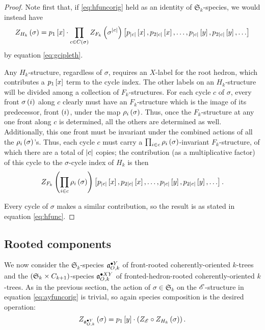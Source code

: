 \documentclass[sectionflow,singlespace,twoside,boldmathhdr]{brandiss} %
\numberwithin{section}{chapter}
\numberwithin{figure}{chapter}
\begin{document}
\begin{proof}
  Note first that, if \eqref{eq:hfuncorig} held as an identity of $\mathfrak{S}_{k}$-species, we would instead have
  \begin{equation*}
    Z_{H_{k}} \pbrac{\sigma} = p_{1} \sbrac{x} \cdot \prod_{c \in C \pbrac{\sigma}} Z_{F_{k}} \pbrac{\sigma^{\abs{c}}} \sbrac{p_{\abs{c}} \sbrac{x}, p_{2 \abs{c}} \sbrac{x}, \dots, p_{\abs{c}} \sbrac{y}, p_{2 \abs{c}} \sbrac{y}, \dots}
  \end{equation*}
  by equation \eqref{eq:gcipleth}.

  Any $H_{k}$-structure, regardless of $\sigma$, requires an $X$-label for the root hedron, which contributes a $p_{1} \sbrac{x}$ term to the cycle index.
  The other labels on an $H_{k}$-structure will be divided among a collection of $F_{k}$-structures.
  For each cycle $c$ of $\sigma$, every front $\sigma \pbrac{i}$ along $c$ clearly must have an $F_{k}$-structure which is the image of its predecessor, front $\pbrac{i}$, under the map $\rho_{i} \pbrac{\sigma}$.
  Thus, once the $F_{k}$-structure at any one front along $c$ is determined, all the others are determined as well.
  Additionally, this one front must be invariant under the combined actions of all the $\rho_{i} \pbrac{\sigma}$'s.
  Thus, each cycle $c$ must carry a $\prod_{i \in c} \rho_{i} \pbrac{\sigma}$-invariant $F_{k}$-structure, of which there are a total of $\abs{c}$ copies; the contribution (as a multiplicative factor) of this cycle to the $\sigma$-cycle index of $H_{k}$ is then
  \begin{equation*}
    Z_{F_{k}} \pbrac{\prod_{i \in c} \rho_{i} \pbrac{\sigma}} \sbrac{p_{\abs{c}} \sbrac{x}, p_{2 \abs{c}} \sbrac{x}, \dots, p_{\abs{c}} \sbrac{y}, p_{2 \abs{c}} \sbrac{y}, \dots}.
  \end{equation*}

  Every cycle of $\sigma$ makes a similar contribution, so the result is as stated in equation \eqref{eq:hfunc}.
\end{proof}

\subsection{Rooted components}\label{ss:ktcycindroot}
We now consider the $\mathfrak{S}_{k}$-species $\pointed[Y]{\mathfrak{a}}_{O, k}$ of front-rooted coherently-oriented $k$-trees and the $\pbrac{\mathfrak{S}_{k} \times C_{k+1}}$-species $\pointed[XY]{\mathfrak{a}}_{O, k}$ of fronted-hedron-rooted coherently-oriented $k$-trees.
As in the previous section, the action of $\sigma \in \mathfrak{S}_{k}$ on the $\specname{E}$-structure in equation \eqref{eq:ayfuncorig} is trivial, so again species composition is the desired operation:
\begin{equation}
  \label{eq:ayfunc}
  Z_{\pointed[Y]{\mathfrak{a}}_{O, k}} \pbrac{\sigma} = p_{1} \sbrac{y} \cdot \pbrac{Z_{\specname{E}} \circ Z_{H_{k}} \pbrac{\sigma}}.
\end{equation}
\end{document}
